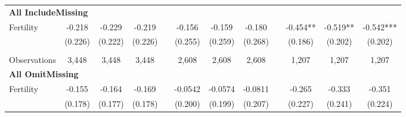 \begin{landscape}
\begin{table}[htpb!]
\begin{center}
\begin{tabular}{lcccp{2mm}cccp{2mm}ccc}
\multicolumn{12}{l}{\textbf{All IncludeMissing}}\\ 
Fertility&-0.218&-0.229&-0.219&&-0.156&-0.159&-0.180&&-0.454**&-0.519**&-0.542***\\
&(0.226)&(0.222)&(0.226)&&(0.255)&(0.259)&(0.268)&&(0.186)&(0.202)&(0.202)\\
\begin{footnotesize}\end{footnotesize}&\begin{footnotesize}\end{footnotesize}&\begin{footnotesize}\end{footnotesize}&\begin{footnotesize}\end{footnotesize}&\begin{footnotesize}\end{footnotesize}&\begin{footnotesize}\end{footnotesize}&\begin{footnotesize}\end{footnotesize}&\begin{footnotesize}\end{footnotesize}&\begin{footnotesize}\end{footnotesize}&\begin{footnotesize}\end{footnotesize}&\begin{footnotesize}\end{footnotesize}&\begin{footnotesize}\end{footnotesize}\\Observations&3,448&3,448&3,448&&2,608&2,608&2,608&&1,207&1,207&1,207\\
\multicolumn{12}{l}{\textbf{All OmitMissing}}\\ 
Fertility&-0.155&-0.164&-0.169&&-0.0542&-0.0574&-0.0811&&-0.265&-0.333&-0.351\\
&(0.178)&(0.177)&(0.178)&&(0.200)&(0.199)&(0.207)&&(0.227)&(0.241)&(0.224)\\

\end{tabular}
\end{center}
\end{table}
\end{landscape}
